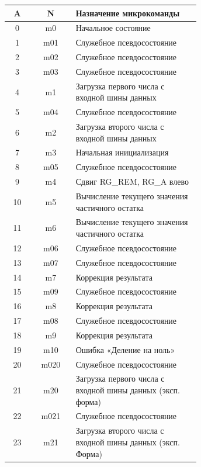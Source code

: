 \documentclass[a4paper,14pt]{extarticle}
\begin{document}
\begin{table}[htbp]

	\small
	\begin{center}
		\begin{tabular}{|c||c|m{0.65\linewidth}|}
			\hline
			\textbf{A} & \textbf{N} & \textbf{Назначение микрокоманды} \\ \hline	\hline
			0 & m0 & Начальное состояние \\ \hline
			1 & m01 & Служебное псевдосостояние \\ \hline
			2 & m02 & Служебное псевдосостояние \\ \hline
			3 & m03 & Служебное псевдосостояние \\ \hline
			4 & m1 & Загрузка первого числа с входной шины данных \\ \hline
			5 & m04 & Служебное псевдосостояние \\ \hline
			6 & m2 & Загрузка второго числа с входной шины данных \\ \hline
			7 & m3 & Начальная инициализация \\ \hline
			8 & m05 & Служебное псевдосостояние \\ \hline
			9 & m4 & Сдвиг RG\_REM, RG\_A влево \\ \hline
			10 & m5 & Вычисление текущего значения частичного остатка \\ \hline
			11 & m6 & Вычисление текущего значения частичного остатка \\ \hline
			12 & m06 & Служебное псевдосостояние \\ \hline
			13 & m07 & Служебное псевдосостояние \\ \hline
			14 & m7 & Коррекция результата \\ \hline
			15 & m09 & Служебное псевдосостояние \\ \hline
			16 & m8 & Коррекция результата \\ \hline
			17 & m08 & Служебное псевдосостояние \\ \hline
			18 & m9 & Коррекция результата \\ \hline
			19 & m10 & Ошибка «Деление на ноль» \\ \hline
			20 & m020 & Служебное псевдосостояние \\ \hline
			21 & m20 & Загрузка первого числа с входной шины данных (эксп. форма) \\ \hline
			22 & m021 & Служебное псевдосостояние \\ \hline
			23 & m21 & Загрузка второго числа с входной шины данных (эксп. Форма) \\ \hline

\end{tabular}
\end{center}
\end{table}
\end{document}
